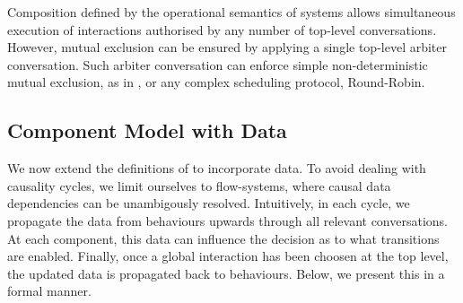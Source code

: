 Composition defined by the operational semantics of systems allows
simultaneous execution of interactions authorised by any number of
top-level conversations.  However, mutual exclusion can be ensured by
applying a single top-level arbiter conversation.  Such arbiter
conversation can enforce simple non-deterministic mutual exclusion, as in
, or any complex scheduling protocol, \eg Round-Robin.


\subsection{Component Model with Data}
\label{sec:data}

We now extend the definitions of  to incorporate data.  To
avoid dealing with causality cycles, we limit ourselves to flow-systems,
where causal data dependencies can be unambigously resolved.  Intuitively,
in each cycle, we propagate the data from behaviours upwards through all
relevant conversations.  At each component, this data can influence the
decision as to what transitions are enabled.  Finally, once a global
interaction has been choosen at the top level, the updated data is
propagated back to behaviours.  Below, we present this in a formal manner.

